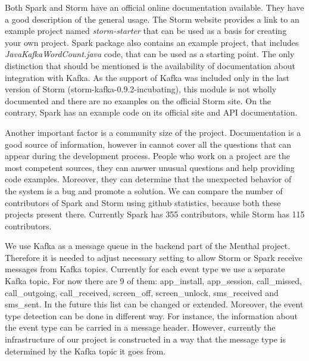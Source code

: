 
Both Spark and Storm have an official online documentation available.
They have a good description of the general usage.
The Storm website provides a link to an example project named \textit{storm-starter} that can be used as a basis for creating your own project.
Spark package also contains an example project, that includes \textit{JavaKafkaWordCount.java} code, that can be used as a starting point. 
The only distinction that should be mentioned is the availability of documentation about integration with Kafka.
As the support of Kafka was included only in the last version of Storm (storm-kafka-0.9.2-incubating), this module is not wholly documented and there are no examples on the official Storm site.
On the contrary, Spark has an example code on its official site and API documentation. 

Another important factor is a community size of the project.
Documentation is a good source of information, however in cannot cover all the questions that can appear during the development process.
People who work on a project are the most competent sources, they can answer unusual questions and help providing code examples.
Moreover, they can determine that the unexpected behavior of the system is a bug and promote a solution.
We can compare the number of contributors of Spark and Storm using github statistics, because both these projects present there.
Currently Spark has 355 contributors, while Storm has 115 contributors. 





We use Kafka as a message queue in the backend part of the Menthal project.
Therefore it is needed to adjust necessary setting to allow Storm or Spark receive messages from Kafka topics.
Currently for each event type we use a separate Kafka topic.
For now there are 9 of them: app\_install, app\_session, call\_missed, call\_outgoing, call\_received, screen\_off, screen\_unlock, sms\_received and sms\_sent.  
In the future this list can be changed or extended.
Moreover, the event type detection can be done in different way.
For instance, the information about the event type can be carried in a message header.
However, currently the infrastructure of our project is constructed in a way that the message type is determined by the Kafka topic it goes from.

